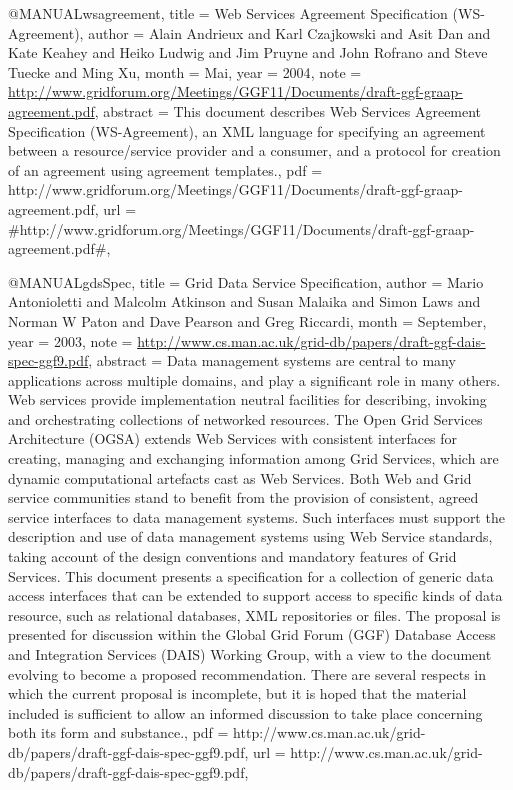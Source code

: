 @MANUAL{wsagreement,
  title = {{Web Services Agreement Specification (WS-Agreement)}},
  author = {Alain Andrieux and Karl Czajkowski and Asit Dan and Kate Keahey and
	Heiko Ludwig and Jim Pruyne and John Rofrano and Steve Tuecke and
	Ming Xu},
  month = {Mai},
  year = {2004},
  note = {\url{http://www.gridforum.org/Meetings/GGF11/Documents/draft-ggf-graap-agreement.pdf}},
  abstract = {This document describes Web Services
Agreement Specification (WS-Agreement),
	an XML language for specifying an
agreement between a resource/service
	provider and a consumer, and a
protocol for creation of an agreement
	using agreement templates.},
  pdf = {http://www.gridforum.org/Meetings/GGF11/Documents/draft-ggf-graap-agreement.pdf},
  url = {#http://www.gridforum.org/Meetings/GGF11/Documents/draft-ggf-graap-agreement.pdf#},
}

@MANUAL{gdsSpec,
  title = {{Grid Data Service Specification}},
  author = {Mario Antonioletti and Malcolm Atkinson and Susan Malaika and Simon
	Laws and Norman W Paton and Dave Pearson and Greg Riccardi},
  month = {September},
  year = {2003},
  note = {\url{http://www.cs.man.ac.uk/grid-db/papers/draft-ggf-dais-spec-ggf9.pdf}},
  abstract = {Data management systems are central to many applications across multiple
domains,
	and play a significant role in many others. Web services
provide
	implementation neutral facilities for describing, invoking and
orchestrating
	collections of networked resources. The Open Grid Services
Architecture
	(OGSA) extends Web Services with consistent interfaces for
creating,
	managing and exchanging information among Grid Services, which
are
	dynamic computational artefacts cast as Web Services. Both Web
and
	Grid service communities stand to benefit from the provision of
consistent,
	agreed service interfaces to data management systems. Such
interfaces
	must support the description and use of data management systems
using
	Web Service standards, taking account of the design conventions
and
	mandatory features of Grid Services. This document presents a
specification
	for a collection of generic data access interfaces that can be
extended
	to support access to specific kinds of data resource, such as
relational
	databases, XML repositories or files. The proposal is presented
for
	discussion within the Global Grid Forum (GGF) Database Access
and
	Integration Services (DAIS) Working Group, with a view to the
document
	evolving to become a proposed recommendation. There are
several respects
	in which the current proposal is incomplete, but it is
hoped that
	the material included is sufficient to allow an informed
discussion
	to take place concerning both its form and substance.},
  pdf = {http://www.cs.man.ac.uk/grid-db/papers/draft-ggf-dais-spec-ggf9.pdf},
  url = {http://www.cs.man.ac.uk/grid-db/papers/draft-ggf-dais-spec-ggf9.pdf},
}

